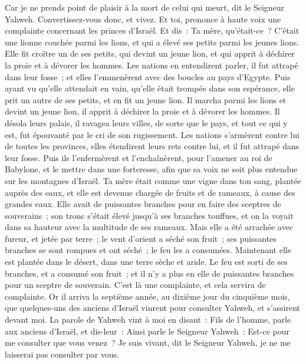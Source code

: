 \begin{multicols}{2}
Car je ne prends point de plaisir à la mort de celui qui meurt, dit le Seigneur Yahweh. Convertissez-vous donc, et vivez.
\VerseOne{}Et toi, prononce à haute voix une complainte concernant les princes d'Israël.
Et dis~: Ta mère, qu'était-ce~? C'était une lionne couchée parmi les lions, et qui a élevé ses petits parmi les jeunes lions.
Elle fit croître un de ses petits, qui devint un jeune lion, et qui apprit à déchirer la proie et à dévorer les hommes.
Les nations en entendirent parler, il fut attrapé dans leur fosse~; et elles l'emmenèrent avec des boucles au pays d'Egypte.
Puis ayant vu qu'elle attendait en vain, qu'elle était trompée dans son espérance, elle prit un autre de ses petits, et en fit un jeune lion.
Il marcha parmi les lions et devint un jeune lion, il apprit à déchirer la proie et à dévorer les hommes.
Il désola leurs palais, il ravagea leurs villes, de sorte que le pays, et tout ce qui y est, fut épouvanté par le cri de son rugissement.
Les nations s'armèrent contre lui de toutes les provinces, elles étendirent leurs rets contre lui, et il fut attrapé dans leur fosse.
Puis ils l'enfermèrent et l'enchaînèrent, pour l'amener au roi de Babylone, et le mettre dans une forteresse, afin que sa voix ne soit plus entendue sur les montagnes d'Israël.
Ta mère était comme une vigne dans ton sang, plantée auprès des eaux, et elle est devenue chargée de fruits et de rameaux, à cause des grandes eaux.
Elle avait de puissantes branches pour en faire des sceptres de souverains~; son tronc s'était élevé jusqu'à ses branches touffues, et on la voyait dans sa hauteur avec la multitude de ses rameaux.
Mais elle a été arrachée avec fureur, et jetée par terre~; le vent d'orient a séché son fruit~; ses puissantes branches se sont rompues et ont séché~; le feu les a consumées.
Maintenant elle est plantée dans le désert, dans une terre sèche et aride.
Le feu est sorti de ses branches, et a consumé son fruit~; et il n'y a plus en elle de puissantes branches pour un sceptre de souverain. C'est là une complainte, et cela servira de complainte.
\VerseOne{}Or il arriva la septième année, au dixième jour du cinquième mois, que quelques-uns des anciens d'Israël vinrent pour consulter Yahweh, et s'assirent devant moi.
La parole de Yahweh vint à moi en disant~:
Fils de l'homme, parle aux anciens d'Israël, et dis-leur~: Ainsi parle le Seigneur Yahweh~: Est-ce pour me consulter que vous venez~? Je suis vivant, dit le Seigneur Yahweh, je ne me laisserai pas consulter par vous.

\end{multicols}
